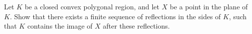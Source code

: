 Let $K$ be a closed convex polygonal region, and let $X$ be a point in the plane of $K$. Show that there exists a finite sequence of reflections in the sides of $K$, such that $K$ contains the image of $X$ after these reflections.
